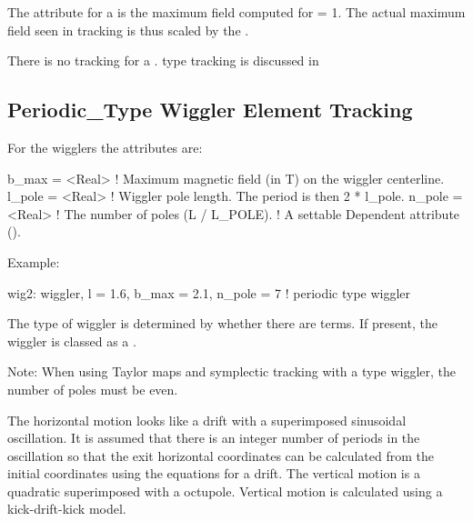 {The  attribute for a   is the
maximum field computed for  = 1. The actual maximum field
seen in tracking is thus scaled by the .

There is no  tracking for a 
.  type tracking is discussed in 

\subsection{Periodic\_Type Wiggler Element Tracking}
\label{s:wiggler.periodic}

For the  wigglers the attributes are: 
\begin{example}  
  b_max    = <Real>  ! Maximum magnetic field (in T) on the wiggler centerline. 
  l_pole   = <Real>  ! Wiggler pole length. The period is then 2 * l_pole.
  n_pole   = <Real>  ! The number of poles (L / L_POLE). 
                     !   A settable Dependent attribute ().
\end{example}

Example:
\begin{example}
  wig2: wiggler, l = 1.6, b_max = 2.1, n_pole = 7  ! periodic type wiggler
\end{example}

The type of wiggler is determined by whether there are 
terms. If present, the wiggler is classed as a .

Note: When using Taylor maps and symplectic tracking with a
 type wiggler, the number of poles must be even.

The horizontal motion looks like a drift with a superimposed
sinusoidal oscillation. It is assumed that there is an integer number
of periods in the oscillation so that the exit horizontal coordinates
can be calculated from the initial coordinates using the equations for
a drift. The vertical motion is a quadratic superimposed with a
octupole. Vertical motion is calculated using a kick-drift-kick model.

}
